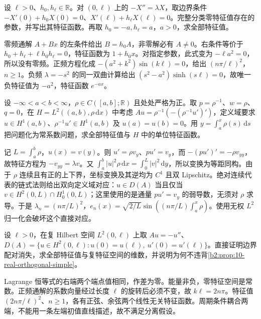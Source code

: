 \begin{exercise}\label{b2:ex:10-robin-zero}
设 \(\ell>0\)、\(h_0,h_\ell\in\mathbb R\)。对 \((0,\ell)\) 上的 \(-X''=\lambda X\)，取边界条件 \(-X'(0)+h_0X(0)=0\)、\(X'(\ell)+h_\ell X(\ell)=0\)。完整分类零特征值存在的参数，并写出其特征函数。再取 \(h_0=-a,h_\ell=a\)，\(a>0\)，求全部特征值。
\end{exercise}
\begin{solution}
零频通解 \(A+Bx\) 的左条件给出 \(B=h_0A\)，非零解必有 \(A\ne0\)。右条件等价于 \(h_0+h_\ell+\ell h_0h_\ell=0\)，特征函数为 \(1+h_0x\)。对指定参数，此式变为 \(-\ell a^2=0\)，所以没有零频。正频方程化成 \(-(a^2+k^2)\sin(k\ell)=0\)，给出 \((n\pi/\ell)^2\)，\(n\geq1\)。负频 \(\lambda=-s^2\) 的同一双曲计算给出 \((s^2-a^2)\sinh(s\ell)=0\)，故唯一负特征值为 \(-a^2\)，特征函数 \(e^{-ax}\)。
\end{solution}

\begin{exercise}\label{b2:ex:10-weighted-coordinate}
设 \(-\infty<a<b<\infty\)，\(\rho\in C([a,b];\mathbb R)\) 且处处严格为正。取 \(p=\rho^{-1}\)、\(w=\rho\)、\(q=0\)，在 \(H=L^2((a,b),\rho\,\mathrm dx)\) 中考虑 \(Au=\rho^{-1}(-(\rho^{-1}u')')\)，定义域要求 \(u\in H^1(a,b)\)、\(\rho^{-1}u'\in H^1(a,b)\) 及 \(u(a)=u(b)=0\)。用 \(y=\int_a^x\rho(s)\,\mathrm{d}s\) 把问题化为常系数问题，求全部特征值与 \(H\) 中的单位特征函数。
\end{exercise}
\begin{solution}
记 \(L=\int_a^b\rho\)，\(u(x)=v(y)\)。则 \(u'=\rho v_y\)、\(pu'=v_y\)，而 \(-(pu')'=-\rho v_{yy}\)，故特征方程为 \(-v_{yy}=\lambda v\)。又 \(\int_a^b|u|^2\rho\,\mathrm{d}x=\int_0^L|v|^2\,\mathrm{d}y\)，所以变换为等距同构。由于 \(\rho\) 连续且有正的上下界，坐标变换及其逆均为 \(C^1\) 且双 Lipschitz。绝对连续代表的链式法则给出双向定义域对应：\(u\in D(A)\) 当且仅当 \(v\in H^2(0,L)\cap H_0^1(0,L)\)；这里使用的是通量 \(pu'=v_y\) 的弱导数，无须对 \(\rho\) 求导。于是 \(\lambda_n=(n\pi/L)^2\)，\(e_n(x)=\sqrt{2/L}\sin((n\pi/L)\int_a^x\rho)\)。使用无权 \(L^2\) 归一化会破坏这个直接对应。
\end{solution}

\begin{exercise}\label{b2:ex:10-periodic-multiplicity}
设 \(\ell>0\)，在复 Hilbert 空间 \(L^2(0,\ell)\) 上取 \(Au=-u''\)、\(D(A)=\{u\in H^2(0,\ell):u(0)=u(\ell),\ u'(0)=u'(\ell)\}\)。直接证明边界配对消失，求全部特征值与复特征空间的维数，并说明为何不违背\cref{b2:prop:10-real-orthogonal-simple}。
\end{exercise}
\begin{solution}
Lagrange 恒等式的右端两个端点值相同，作差为零。能量非负，零特征空间是常数。正频通解的系数向量经过长度 \(\ell\) 的旋转后必须不变，故 \(k\ell=2n\pi\)。特征值 \((2n\pi/\ell)^2\)、\(n\geq1\)，各有正弦、余弦两个线性无关特征函数。周期条件耦合两端，不能用一条左端初值直线描述，故不满足分离假设。
\end{solution}

